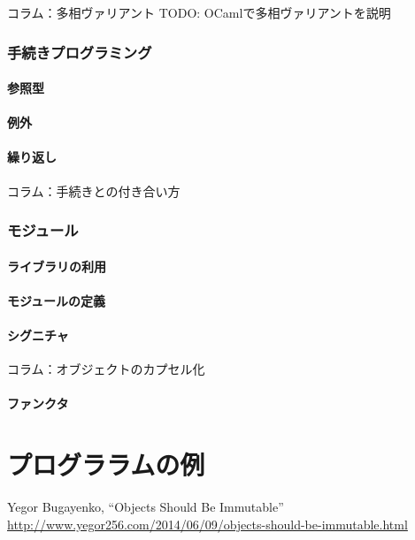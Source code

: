 \documentclass[11pt,a4paper]{article}
\begin{document}
\begin{itembox}[l]{コラム：多相ヴァリアント}
  TODO:
OCamlで多相ヴァリアントを説明
\end{itembox}

\section{手続きプログラミング}
\subsection{参照型}
\subsection{例外}
\subsection{繰り返し}

\begin{itembox}[l]{コラム：手続きとの付き合い方}

\end{itembox}

\section{モジュール}
\subsection{ライブラリの利用}
\subsection{モジュールの定義}
\subsection{シグニチャ}
\begin{itembox}[l]{コラム：オブジェクトのカプセル化}
\end{itembox}
\subsection{ファンクタ}

\part{プログララムの例}

\begin{thebibliography}{9}
   Yegor Bugayenko, ``Objects Should Be Immutable''\\
    \url{http://www.yegor256.com/2014/06/09/objects-should-be-immutable.html}
\end{thebibliography}
\end{document}
